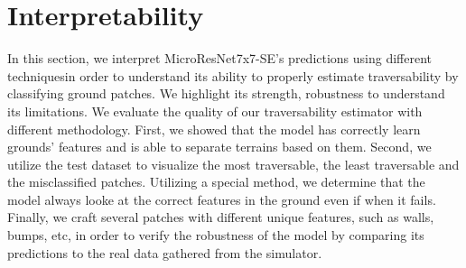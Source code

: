 \documentclass[../document.tex]{subfiles}
\begin{document}
\chapter{Interpretability}
\label{chap: interpretability}
In this section, we interpret MicroResNet7x7-SE's predictions using different techniquesin order to understand its ability to properly estimate traversability by classifying ground patches. We highlight its strength, robustness to understand its limitations. We evaluate the quality of our traversability estimator with different methodology. First, we showed that the model has correctly learn grounds' features and is able to separate terrains based on them. Second, we utilize the test dataset to visualize the most traversable, the least traversable and the misclassified patches.  Utilizing a special method, we determine that the model always looke at the correct features in the ground even if when it fails. Finally, we craft several patches with different unique features, such as walls, bumps, etc, in order to verify the robustness of the model by comparing its predictions to the real data gathered from the simulator. 
\end{document}
